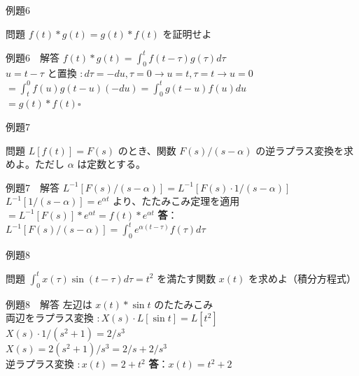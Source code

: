 \documentclass[professionalfonts]{beamer}
\begin{document}
\begin{frame}{例題6}
  \begin{exampleblock}{問題}
    $f(t) * g(t) = g(t) * f(t)$ を証明せよ\\[2pt]
  \end{exampleblock}
\end{frame}

\begin{frame}{例題6　解答}
  $f(t)*g(t) = \int_{0}^t f(t-\tau)g(\tau)d\tau$\\[4pt]
  $u = t-\tau$ と置換 $: d\tau = -du, \tau=0 \to u=t, \tau=t \to u=0$\\[4pt]
  $= \int_{t}^0 f(u)g(t-u)(-du) = \int_{0}^t g(t-u)f(u)du$\\[4pt]
  $= g(t)*f(t)$\hfill$\square$
\end{frame}

\begin{frame}{例題7}
  \begin{exampleblock}{問題}
    $L[f(t)] = F(s)$ のとき、関数 $F(s)/(s-\alpha)$ の逆ラプラス変換を求めよ。ただし $\alpha$ は定数とする。\\[2pt]
  \end{exampleblock}
\end{frame}

\begin{frame}{例題7　解答}
  $L^{-1}[F(s)/(s-\alpha)] = L^{-1}[F(s) \cdot 1/(s-\alpha)]$\\[4pt]
  $L^{-1}[1/(s-\alpha)] = e^{\alpha t}$ より、たたみこみ定理を適用\\[4pt]
  $= L^{-1}[F(s)] * e^{\alpha t} = f(t) * e^{\alpha t}$
  \medskip\textbf{答}：$L^{-1}[F(s)/(s-\alpha)] = \int_{0}^t e^{\alpha(t-\tau)} f(\tau) d\tau$
\end{frame}

\begin{frame}{例題8}
  \begin{exampleblock}{問題}
    $\int_{0}^t x(\tau) \sin(t-\tau) d\tau = t^{2}$ を満たす関数 $x(t)$ を求めよ（積分方程式）\\[2pt]
  \end{exampleblock}
\end{frame}

\begin{frame}{例題8　解答}
  左辺は $x(t) * \sin t$ のたたみこみ\\[4pt]
  両辺をラプラス変換 $: X(s) \cdot L[\sin t] = L[t^{2}]$\\[4pt]
  $X(s) \cdot 1/(s^{2}+1) = 2/s^{3}$\\[4pt]
  $X(s) = 2(s^{2}+1)/s^{3} = 2/s + 2/s^{3}$\\[4pt]
  逆ラプラス変換 $: x(t) = 2 + t^{2}$
  \medskip\textbf{答}：$x(t) = t^{2} + 2$
\end{frame}
\end{document}
